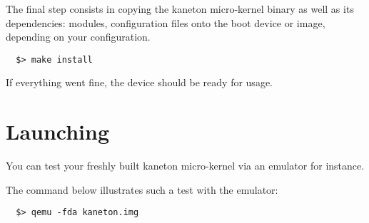 The final step consists in copying the kaneton micro-kernel binary as well as
its dependencies: modules, configuration files \etc{} onto the boot device
or image, depending on your configuration.

\begin{verbatim}
  $> make install
\end{verbatim}

If everything went fine, the device should be ready for usage.

%
%

\section{Launching}

You can test your freshly built kaneton micro-kernel via an emulator
for instance.

The command below illustrates such a test with the  emulator:

\begin{verbatim}
  $> qemu -fda kaneton.img
\end{verbatim}
